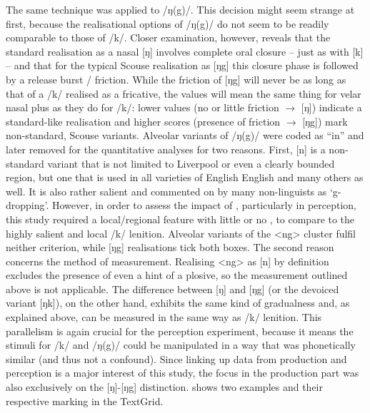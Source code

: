 The same technique was applied to /ŋ(g)/.
This decision might seem strange at first, because the realisational options of /ŋ(g)/ do not seem to be readily comparable to those of /k/.
Closer examination, however, reveals that the standard realisation as a nasal [ŋ] involves complete oral closure -- just as with [k] -- and that for the typical Scouse realisation as [ŋg] this closure phase is followed by a release burst / friction.
While the friction of [ŋg] will never be as long as that of a /k/ realised as a fricative, the  values will mean the same thing for velar nasal plus as they do for /k/: lower values (no or little friction \(\rightarrow\) [ŋ]) indicate a standard-like realisation and higher scores (presence of friction \(\rightarrow\) [ŋg]) mark non-standard, Scouse variants.
Alveolar variants of /ŋ(g)/ were coded as ``in'' and later removed for the quantitative analyses for two reasons.
First, [n] is a non-standard variant that is not limited to Liverpool or even a clearly bounded region, but one that is used in all varieties of English English and many others as well.
It is also rather salient and commented on by many non-linguists as \enquote*{g-dropping}.
However, in order to assess the impact of , particularly in perception, this study required a local/regional feature with little or no , to compare to the highly salient and local /k/ lenition.
Alveolar variants of the <ng> cluster fulfil neither criterion, while [ŋg] realisations tick both boxes.
The second reason concerns the method of measurement.
Realising <ng> as [n] by definition excludes the presence of even a hint of a plosive, so the  measurement outlined above is not applicable.
The difference between [ŋ] and [ŋg] (or the devoiced variant [ŋk]), on the other hand, exhibits the same kind of gradualness and, as explained above, can be measured in the same way as /k/ lenition.
This parallelism is again crucial for the perception experiment, because it means the stimuli for /k/ and /ŋ(g)/ could be manipulated in a way that was phonetically similar (and thus not a confound).
Since linking up data from production and perception is a major interest of this study, the focus in the production part was also exclusively on the [ŋ]-[ŋg] distinction.
 shows two examples and their respective marking in the TextGrid.

